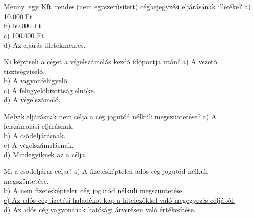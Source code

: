 \begin{frame}

\begin{tcolorbox}[title={102. Kérdés}]
Mennyi egy Kft. rendes (nem egyszerûsített) cégbejegyzési eljárásának illetéke?
\tcblower
a) 10.000 Ft\\
b) 50.000 Ft\\
c) 100.000 Ft\\
\uline {d) Az eljárás illetékmentes.}
\end{tcolorbox}

\begin{tcolorbox}[title={103. Kérdés}]
Ki képviseli a céget a végelszámolás kezdõ idõpontja után?
\tcblower
a) A vezetõ tisztségviselõ.\\
b) A vagyonfelügyelõ.\\
c) A felügyelõbizottság elnöke.\\
\uline {d) A végelszámoló.}
\end{tcolorbox}

\begin{tcolorbox}[title={104. Kérdés}]
Melyik eljárásnak nem célja a cég jogutód nélküli megszüntetése?
\tcblower
a) A felszámolási eljárásnak.\\
\uline {b) A csõdeljárásnak.}\\
c) A végelszámolásnak.\\
d) Mindegyiknek az a célja.
\end{tcolorbox}

\begin{tcolorbox}[title={105. Kérdés}]
Mi a csõdeljárás célja?
\tcblower
a) A fizetésképtelen adós cég jogutód nélküli megszüntetése.\\
b) A nem fizetésképtelen cég jogutód nélküli megszüntetése.\\
\uline {c) Az adós cég fizetési haladékot kap a hitelezõkkel való megegyezés céljából.}\\
d) Az adós cég vagyonának hatósági árverésen való értékesítése.
\end{tcolorbox}

\end{frame}


